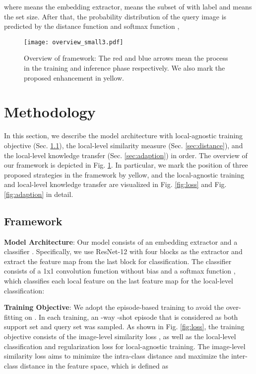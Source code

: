 \documentclass{article}
\begin{document}
where  means the embedding extractor,  means the subset of  with label  and  means the set size.
After that, the probability distribution of the query image  is predicted by the distance function  and softmax function ,




\begin{figure}[h]
    \begin{center}
    \texttt{[image: overview\_small3.pdf]}
    \end{center}
    \vspace{-15pt}
  \caption{Overview of framework: The red and blue arrows mean the process in the training and inference phase respectively. We also mark the proposed enhancement in yellow.
    }
    \vspace{-10pt}
\label{fig:overview}
\end{figure}

\section{Methodology}
\label{approach}
In this section, we describe the model architecture with local-agnostic training objective (Sec. \ref{sec:inference}), the local-level similarity measure (Sec. \ref{sec:distance}), and the local-level knowledge transfer (Sec. \ref{sec:adaption}) in order.
The overview of our framework is depicted in Fig. \ref{fig:overview}. In particular, we mark the position of three proposed strategies in the framework by yellow, and the local-agnostic training and local-level knowledge transfer are visualized in Fig. \ref{fig:loss} and Fig. \ref{fig:adaption} in detail.





\subsection{Framework}
\label{sec:inference}
\noindent\textbf{Model Architecture}: Our model consists of an embedding extractor  and a classifier . Specifically, we use ResNet-12 \cite{he2016deep} with four blocks as the extractor and extract the feature map from the last block  for classification. The classifier  consists of a 1x1 convolution function  without bias and a softmax function , which classifies each local feature on the last feature map for the local-level classification:



\noindent\textbf{Training Objective}: 
We adopt the episode-based training \cite{snell2017prototypical} to avoid the over-fitting on . In each training, an -way -shot episode  that is considered as both support set and query set was sampled. As shown in Fig. \ref{fig:loss}, the training objective consists of the image-level similarity loss , as well as the local-level classification  and regularization loss  for local-agnostic training. The image-level similarity loss aims to minimize the intra-class distance and maximize the inter-class distance in the feature space, which is defined as
\end{document}
